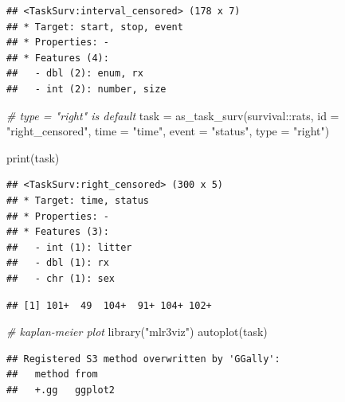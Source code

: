 \documentclass[
]{scrbook}
\newenvironment{Shaded}{\begin{snugshade}}{\end{snugshade}}
\newcommand{\AttributeTok}[1]{\textcolor[rgb]{0.77,0.63,0.00}{#1}}
\newcommand{\CommentTok}[1]{\textcolor[rgb]{0.56,0.35,0.01}{\textit{#1}}}
\newcommand{\FunctionTok}[1]{\textcolor[rgb]{0.00,0.00,0.00}{#1}}
\newcommand{\NormalTok}[1]{#1}
\newcommand{\OtherTok}[1]{\textcolor[rgb]{0.56,0.35,0.01}{#1}}
\newcommand{\SpecialCharTok}[1]{\textcolor[rgb]{0.00,0.00,0.00}{#1}}
\newcommand{\StringTok}[1]{\textcolor[rgb]{0.31,0.60,0.02}{#1}}
\renewenvironment{Shaded} {\begin{snugshade}\small} {\end{snugshade}}
\begin{document}
\begin{verbatim}
## <TaskSurv:interval_censored> (178 x 7)
## * Target: start, stop, event
## * Properties: -
## * Features (4):
##   - dbl (2): enum, rx
##   - int (2): number, size
\end{verbatim}

\begin{Shaded}
\begin{Highlighting}[]
\CommentTok{\# type = "right" is default}
\NormalTok{task }\OtherTok{=} \FunctionTok{as\_task\_surv}\NormalTok{(survival}\SpecialCharTok{::}\NormalTok{rats, }\AttributeTok{id =} \StringTok{"right\_censored"}\NormalTok{,}
  \AttributeTok{time =} \StringTok{"time"}\NormalTok{, }\AttributeTok{event =} \StringTok{"status"}\NormalTok{, }\AttributeTok{type =} \StringTok{"right"}\NormalTok{)}

\FunctionTok{print}\NormalTok{(task)}
\end{Highlighting}
\end{Shaded}

\begin{verbatim}
## <TaskSurv:right_censored> (300 x 5)
## * Target: time, status
## * Properties: -
## * Features (3):
##   - int (1): litter
##   - dbl (1): rx
##   - chr (1): sex
\end{verbatim}

\begin{Shaded}
\end{Shaded}

\begin{verbatim}
## [1] 101+  49  104+  91+ 104+ 102+
\end{verbatim}

\begin{Shaded}
\begin{Highlighting}[]
\CommentTok{\# kaplan{-}meier plot}
\FunctionTok{library}\NormalTok{(}\StringTok{"mlr3viz"}\NormalTok{)}
\FunctionTok{autoplot}\NormalTok{(task)}
\end{Highlighting}
\end{Shaded}

\begin{verbatim}
## Registered S3 method overwritten by 'GGally':
##   method from   
##   +.gg   ggplot2
\end{verbatim}
\end{document}
